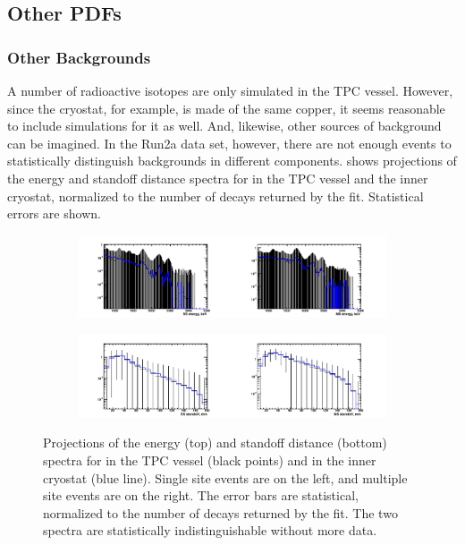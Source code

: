 \documentclass[herrin-thesis.tex]{subfiles}
\begin{document}
\subsection{Other PDFs}
\subsubsection{Other Backgrounds}
A number of radioactive isotopes are only simulated in the TPC vessel. However, since the cryostat, for example, is made of the same copper, it seems reasonable to include simulations for it as well. And, likewise, other sources of background can be imagined. In the Run2a data set, however, there are not enough events to statistically distinguish backgrounds in different components.  shows projections of the energy and standoff distance spectra for  in the TPC vessel and the inner cryostat, normalized to the number of  decays returned by the fit. Statistical errors are shown.
 
\begin{figure}[htp]
\centering
\begin{subfigure}[c]{\textwidth}
	\centering
	\includegraphics[width=\textwidth]{./plots/analysis_degenerate_uranium_spectra_e.pdf}
\end{subfigure}
\begin{subfigure}[c]{\textwidth}
	\centering
	\includegraphics[width=\textwidth]{./plots/analysis_degenerate_uranium_spectra_s.pdf}
\end{subfigure}
\caption[Lack of statistical power to distinguish the source of uranium backgrounds]{Projections of the energy (top) and standoff distance (bottom) spectra for  in the TPC vessel (black points) and in the inner cryostat (blue line). Single site events are on the left, and multiple site events are on the right. The error bars are statistical, normalized to the number of  decays returned by the fit. The two spectra are statistically indistinguishable without more data.}
\label{fig:analysis_degenerate_uranium_spectra}
\end{figure}
\end{document}
